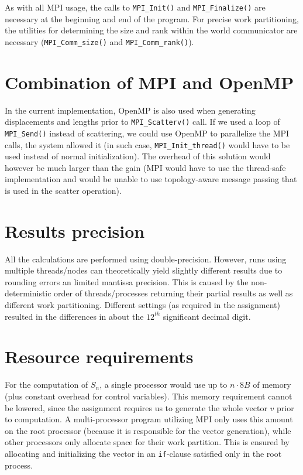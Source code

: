 \documentclass[12pt]{simple-assignment} %
\begin{document}
As with all MPI usage, the calls to \texttt{MPI\_Init()} and \texttt{MPI\_Finalize()} are necessary at the beginning and end of the program. For precise work partitioning, the utilities for determining the size and rank within the world communicator are necessary (\texttt{MPI\_Comm\_size()} and \texttt{MPI\_Comm\_rank()}).

\section{Combination of MPI and OpenMP}
In the current implementation, OpenMP is also used when generating displacements and lengths prior to \texttt{MPI\_Scatterv()} call. If we used a loop of \texttt{MPI\_Send()} instead of scattering, we could use OpenMP to parallelize the MPI calls, the system allowed it (in such case, \texttt{MPI\_Init\_thread()} would have to be used instead of normal initialization). The overhead of this solution would however be much larger than the gain (MPI would have to use the thread-safe implementation and would be unable to use topology-aware message passing that is used in the scatter operation).

\section{Results precision}
All the calculations are performed using double-precision. However, runs using multiple threads/nodes can theoretically yield slightly different results due to rounding errors an limited mantissa precision. This is caused by the non-deterministic order of threads/processes returning their partial results as well as different work partitioning. Different settings (as required in the assignment) resulted in the differences in about the $12^{th}$ significant decimal digit.

\section{Resource requirements}
For the computation of $S_n$, a single processor would use up to $n \cdot 8B$ of memory (plus constant overhead for control variables). This memory requirement cannot be lowered, since the assignment requires us to generate the whole vector $v$ prior to computation. A multi-processor program utilizing MPI only uses this amount on the root processor (because it is responsible for the vector generation), while other processors only allocate space for their work partition. This is ensured by allocating and initializing the vector in an \texttt{if}-clause satisfied only in the root process. 
\end{document}
